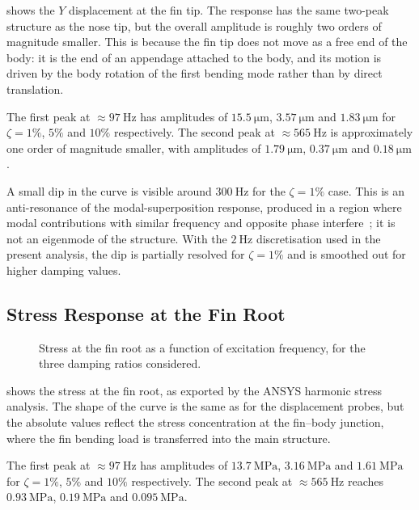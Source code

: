  shows the $Y$ displacement at the fin tip. The response has the same two-peak structure as the nose tip, but the overall amplitude is roughly two orders of magnitude smaller. This is because the fin tip does not move as a free end of the body: it is the end of an appendage attached to the body, and its motion is driven by the body rotation of the first bending mode rather than by direct translation.

The first peak at $\approx \SI{97}{\hertz}$ has amplitudes of $\SI{15.5}{\micro\metre}$, $\SI{3.57}{\micro\metre}$ and $\SI{1.83}{\micro\metre}$ for $\zeta = 1\%$, $5\%$ and $10\%$ respectively. The second peak at $\approx \SI{565}{\hertz}$ is approximately one order of magnitude smaller, with amplitudes of $\SI{1.79}{\micro\metre}$, $\SI{0.37}{\micro\metre}$ and $\SI{0.18}{\micro\metre}$.

A small dip in the curve is visible around $\SI{300}{\hertz}$ for the $\zeta = 1\%$ case. This is an anti-resonance of the modal-superposition response, produced in a region where modal contributions with similar frequency and opposite phase interfere~\cite{inman_engineering_vibration}; it is not an eigenmode of the structure. With the $2\ \si{\hertz}$ discretisation used in the present analysis, the dip is partially resolved for $\zeta = 1\%$ and is smoothed out for higher damping values.

\subsection{Stress Response at the Fin Root}

\begin{figure}[H]
    \centering
    
    \caption{Stress at the fin root as a function of excitation frequency, for the three damping ratios considered.}
    \label{fig:frf_stress}
\end{figure}

 shows the stress at the fin root, as exported by the ANSYS harmonic stress analysis. The shape of the curve is the same as for the displacement probes, but the absolute values reflect the stress concentration at the fin--body junction, where the fin bending load is transferred into the main structure.

The first peak at $\approx \SI{97}{\hertz}$ has amplitudes of $\SI{13.7}{\mega\pascal}$, $\SI{3.16}{\mega\pascal}$ and $\SI{1.61}{\mega\pascal}$ for $\zeta = 1\%$, $5\%$ and $10\%$ respectively. The second peak at $\approx \SI{565}{\hertz}$ reaches $\SI{0.93}{\mega\pascal}$, $\SI{0.19}{\mega\pascal}$ and $\SI{0.095}{\mega\pascal}$.

